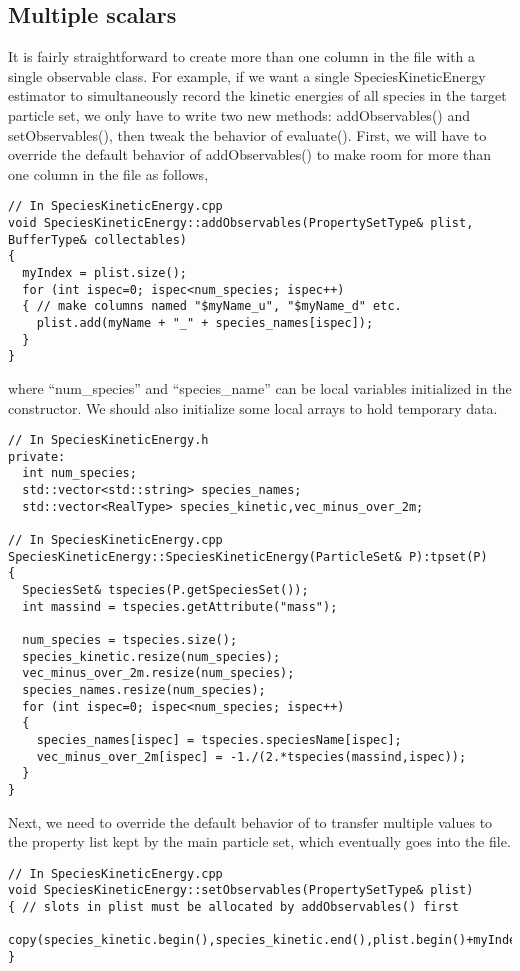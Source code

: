 \subsection{Multiple scalars}
It is fairly straightforward to create more than one column in the  file with a single observable class. For example, if we want a single SpeciesKineticEnergy estimator to simultaneously record the kinetic energies of all species in the target particle set, we only have to write two new methods: addObservables() and setObservables(), then tweak the behavior of evaluate(). First, we will have to override the default behavior of addObservables() to make room for more than one column in the  file as follows,
\begin{lstlisting}[style=C++]
// In SpeciesKineticEnergy.cpp
void SpeciesKineticEnergy::addObservables(PropertySetType& plist, BufferType& collectables)
{
  myIndex = plist.size();
  for (int ispec=0; ispec<num_species; ispec++)
  { // make columns named "$myName_u", "$myName_d" etc.
    plist.add(myName + "_" + species_names[ispec]);
  }
}
\end{lstlisting}
where ``num\_species'' and ``species\_name'' can be local variables initialized in the constructor. We should also initialize some local arrays to hold temporary data.
\begin{lstlisting}[style=C++]
// In SpeciesKineticEnergy.h
private:
  int num_species;
  std::vector<std::string> species_names;
  std::vector<RealType> species_kinetic,vec_minus_over_2m;
  
// In SpeciesKineticEnergy.cpp
SpeciesKineticEnergy::SpeciesKineticEnergy(ParticleSet& P):tpset(P)
{
  SpeciesSet& tspecies(P.getSpeciesSet());
  int massind = tspecies.getAttribute("mass");

  num_species = tspecies.size();
  species_kinetic.resize(num_species);
  vec_minus_over_2m.resize(num_species);
  species_names.resize(num_species);
  for (int ispec=0; ispec<num_species; ispec++)
  {
    species_names[ispec] = tspecies.speciesName[ispec];
    vec_minus_over_2m[ispec] = -1./(2.*tspecies(massind,ispec));   
  }
}
\end{lstlisting}
Next, we need to override the default behavior of  to transfer multiple values to the property list kept by the main particle set, which eventually goes into the  file.
\begin{lstlisting}[style=C++]
// In SpeciesKineticEnergy.cpp
void SpeciesKineticEnergy::setObservables(PropertySetType& plist)
{ // slots in plist must be allocated by addObservables() first
  copy(species_kinetic.begin(),species_kinetic.end(),plist.begin()+myIndex);
}
\end{lstlisting}
